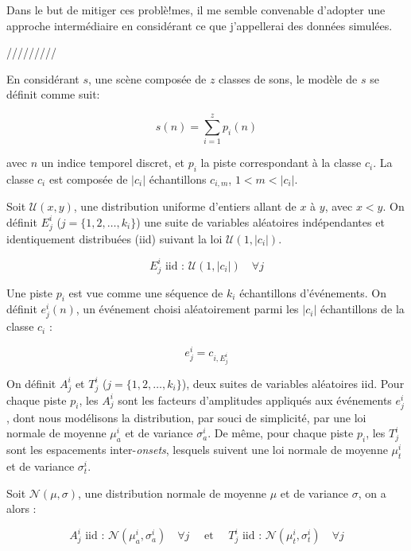 Dans le but de mitiger ces problè!mes, il me semble convenable d'adopter une approche intermédiaire en considérant ce que j'appellerai des données simulées.


/////////

En considérant $s$, une scène composée de $z$ classes de sons, le modèle de $s$ se définit comme suit:

\begin{equation}
s(n)=\sum_{i=1}^{z}p_i(n)
\end{equation}

avec $n$ un indice temporel discret, et $p_i$ la piste correspondant à la classe $c_i$. La classe $c_i$ est composée de $\vert c_i\vert$ échantillons $c_{i,m}$, $1<m<\vert c_i\vert$.

Soit $\mathcal{U}(x,y)$, une distribution uniforme d'entiers allant de $x$ à $y$, avec $x<y$. On définit $E_j^i$ ($j=\lbrace 1,2,\ldots,k_i\rbrace$) une suite de variables aléatoires indépendantes et identiquement distribuées (iid) suivant la loi $\mathcal{U}(1,\vert c_i \vert)$.

\begin{equation}
E_j^i \textrm{ iid : } \mathcal{U}(1,\vert c_i \vert) \quad \forall j
\end{equation}

Une piste $p_i$ est vue comme une séquence de $k_i$ échantillons d'événements. On définit $e_j^i(n)$, un événement choisi aléatoirement parmi les $\vert c_i\vert$ échantillons de la classe $c_i$ :

\begin{equation}
e_j^i=c_{i,E_j^i}
\end{equation}

On définit $A^i_j$ et $T^i_j$ ($j=\lbrace 1,2,\ldots,k_i\rbrace$), deux suites de variables aléatoires iid. Pour chaque piste $p_i$, les $A^i_j$ sont les facteurs d'amplitudes appliqués aux événements $e_j^i$, dont nous modélisons la distribution, par souci de simplicité, par une loi normale de moyenne $\mu_a^i$ et de variance $\sigma_a^i$. De même, pour chaque piste $p_i$, les $T_j^i$ sont les espacements inter-\emph{onsets}, lesquels suivent une loi normale de moyenne $\mu_t^i$ et de variance $\sigma_t^i$.

Soit $\mathcal{N}(\mu,\sigma)$, une distribution normale de moyenne $\mu$ et de variance $\sigma$, on a alors :

\begin{equation}
\label{eq:ch4_eq1}
A_j^i \textrm{ iid : } \mathcal{N}(\mu_a^{i},\sigma_a^{i}) \quad \forall j \quad \textrm{ et } \quad T_j^i \textrm{ iid : } \mathcal{N}({\mu_t^{i},\sigma_t^{i}}) \quad \forall j
\end{equation}

